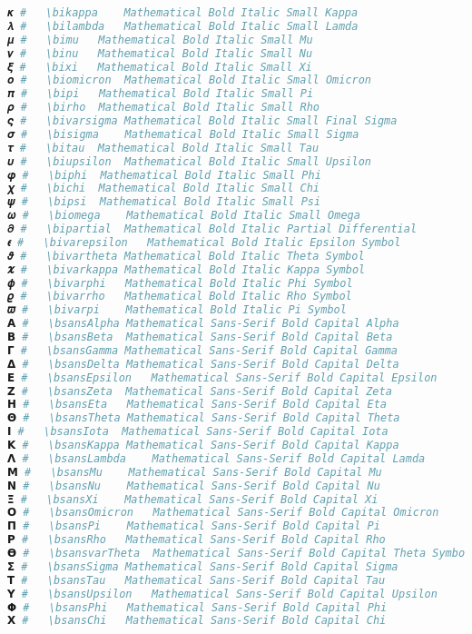 \begin{lstlisting}[language=Julia, style=julia]
𝜿 #   \bikappa    Mathematical Bold Italic Small Kappa
𝝀 #   \bilambda   Mathematical Bold Italic Small Lamda
𝝁 #   \bimu   Mathematical Bold Italic Small Mu
𝝂 #   \binu   Mathematical Bold Italic Small Nu
𝝃 #   \bixi   Mathematical Bold Italic Small Xi
𝝄 #   \biomicron  Mathematical Bold Italic Small Omicron
𝝅 #   \bipi   Mathematical Bold Italic Small Pi
𝝆 #   \birho  Mathematical Bold Italic Small Rho
𝝇 #   \bivarsigma Mathematical Bold Italic Small Final Sigma
𝝈 #   \bisigma    Mathematical Bold Italic Small Sigma
𝝉 #   \bitau  Mathematical Bold Italic Small Tau
𝝊 #   \biupsilon  Mathematical Bold Italic Small Upsilon
𝝋 #   \biphi  Mathematical Bold Italic Small Phi
𝝌 #   \bichi  Mathematical Bold Italic Small Chi
𝝍 #   \bipsi  Mathematical Bold Italic Small Psi
𝝎 #   \biomega    Mathematical Bold Italic Small Omega
𝝏 #   \bipartial  Mathematical Bold Italic Partial Differential
𝝐 #   \bivarepsilon   Mathematical Bold Italic Epsilon Symbol
𝝑 #   \bivartheta Mathematical Bold Italic Theta Symbol
𝝒 #   \bivarkappa Mathematical Bold Italic Kappa Symbol
𝝓 #   \bivarphi   Mathematical Bold Italic Phi Symbol
𝝔 #   \bivarrho   Mathematical Bold Italic Rho Symbol
𝝕 #   \bivarpi    Mathematical Bold Italic Pi Symbol
𝝖 #   \bsansAlpha Mathematical Sans-Serif Bold Capital Alpha
𝝗 #   \bsansBeta  Mathematical Sans-Serif Bold Capital Beta
𝝘 #   \bsansGamma Mathematical Sans-Serif Bold Capital Gamma
𝝙 #   \bsansDelta Mathematical Sans-Serif Bold Capital Delta
𝝚 #   \bsansEpsilon   Mathematical Sans-Serif Bold Capital Epsilon
𝝛 #   \bsansZeta  Mathematical Sans-Serif Bold Capital Zeta
𝝜 #   \bsansEta   Mathematical Sans-Serif Bold Capital Eta
𝝝 #   \bsansTheta Mathematical Sans-Serif Bold Capital Theta
𝝞 #   \bsansIota  Mathematical Sans-Serif Bold Capital Iota
𝝟 #   \bsansKappa Mathematical Sans-Serif Bold Capital Kappa
𝝠 #   \bsansLambda    Mathematical Sans-Serif Bold Capital Lamda
𝝡 #   \bsansMu    Mathematical Sans-Serif Bold Capital Mu
𝝢 #   \bsansNu    Mathematical Sans-Serif Bold Capital Nu
𝝣 #   \bsansXi    Mathematical Sans-Serif Bold Capital Xi
𝝤 #   \bsansOmicron   Mathematical Sans-Serif Bold Capital Omicron
𝝥 #   \bsansPi    Mathematical Sans-Serif Bold Capital Pi
𝝦 #   \bsansRho   Mathematical Sans-Serif Bold Capital Rho
𝝧 #   \bsansvarTheta  Mathematical Sans-Serif Bold Capital Theta Symbol
𝝨 #   \bsansSigma Mathematical Sans-Serif Bold Capital Sigma
𝝩 #   \bsansTau   Mathematical Sans-Serif Bold Capital Tau
𝝪 #   \bsansUpsilon   Mathematical Sans-Serif Bold Capital Upsilon
𝝫 #   \bsansPhi   Mathematical Sans-Serif Bold Capital Phi
𝝬 #   \bsansChi   Mathematical Sans-Serif Bold Capital Chi

\end{lstlisting}
